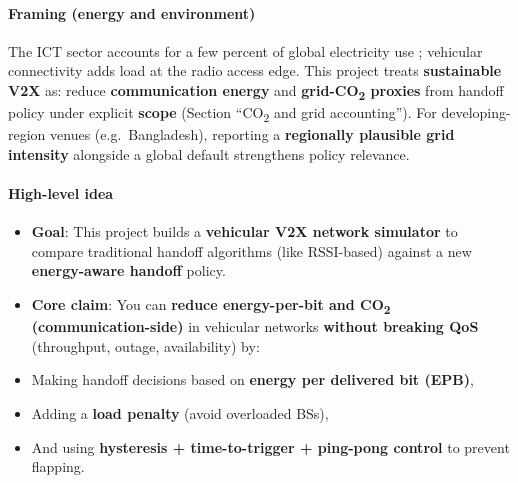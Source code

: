 \documentclass[conference]{IEEEtran}
\begin{document}
\paragraph*{Framing (energy and environment)}
The ICT sector accounts for a few percent of global electricity use \cite{malmodin2018global}; vehicular connectivity adds load at the radio access edge. This project treats \textbf{sustainable V2X} as: reduce \textbf{communication energy} and \textbf{grid-CO\textsubscript{2} proxies} from handoff policy under explicit \textbf{scope} (Section ``CO\textsubscript{2} and grid accounting''). For developing-region venues (e.g.\ Bangladesh), reporting a \textbf{regionally plausible grid intensity} alongside a global default strengthens policy relevance.

\paragraph*{High-level idea}
\begin{itemize}
\item \textbf{Goal}: This project builds a \textbf{vehicular V2X network simulator} to compare traditional handoff algorithms (like RSSI-based) against a new \textbf{energy-aware handoff} policy.
\item \textbf{Core claim}: You can \textbf{reduce energy-per-bit and CO\textsubscript{2} (communication-side)} in vehicular networks \textbf{without breaking QoS} (throughput, outage, availability) by:
\item Making handoff decisions based on \textbf{energy per delivered bit (EPB)},
\item Adding a \textbf{load penalty} (avoid overloaded BSs),
\item And using \textbf{hysteresis + time-to-trigger + ping-pong control} to prevent flapping.
\end{itemize}
\end{document}
